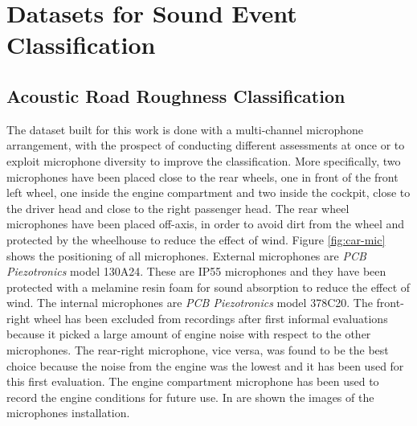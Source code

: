\section{Datasets for Sound Event Classification}

\subsection{Acoustic Road Roughness Classification}
The dataset built for this work is done with a multi-channel microphone arrangement, with the prospect of conducting different assessments at once or to exploit microphone diversity to improve the classification. More specifically, two microphones have been placed close to the rear wheels, one in front of the front left wheel, one inside the engine compartment and two inside the cockpit, close to the driver head and close to the right passenger head. The rear wheel microphones have been placed off-axis, in order to avoid dirt from the wheel and protected by the wheelhouse to reduce the effect of wind. Figure \ref{fig:car-mic} shows the positioning of all microphones. External microphones are \textit{PCB Piezotronics} model 130A24. These are IP55 microphones and they have been protected with a melamine resin foam for sound absorption to reduce the effect of wind. The internal microphones are \textit{PCB Piezotronics} model 378C20. The front-right wheel has been excluded from recordings after first informal evaluations because it picked a large amount of engine noise with respect to the other microphones. The rear-right microphone, vice versa, was found to be the best choice because the noise from the engine was the lowest and it has been used for this first evaluation. The engine compartment microphone has been used to record the engine conditions for future use. In  are shown the images of the microphones installation. 

